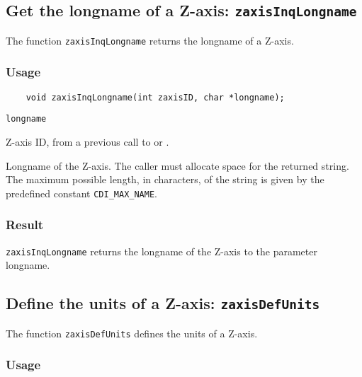 \subsection{Get the longname of a Z-axis: {\tt zaxisInqLongname}}
\label{zaxisInqLongname}

The function {\tt zaxisInqLongname} returns the longname of a Z-axis.

\subsubsection*{Usage}

\begin{verbatim}
    void zaxisInqLongname(int zaxisID, char *longname);
\end{verbatim}

\hspace*{4mm}\begin{minipage}[]{15cm}
\begin{deflist}{\tt longname\ }
\item[{\tt zaxisID}]
Z-axis ID, from a previous call to {} or {}.
\item[{\tt longname}]
Longname of the Z-axis. The caller must allocate space for the
                    returned string. The maximum possible length, in characters, of
                    the string is given by the predefined constant {\tt CDI\_MAX\_NAME}.

\end{deflist}
\end{minipage}

\subsubsection*{Result}

{\tt zaxisInqLongname} returns the longname of the Z-axis to the parameter longname.



\subsection{Define the units of a Z-axis: {\tt zaxisDefUnits}}
\label{zaxisDefUnits}

The function {\tt zaxisDefUnits} defines the units of a Z-axis.

\subsubsection*{Usage}

